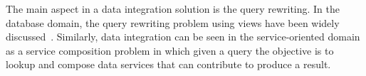 
The main aspect in a data integration solution is the query rewriting. In the database domain, the query rewriting problem using views have been widely discussed~\cite{Halevy:2001,Levy:1996,Duschka:1997,Pottinger:2001}.
Similarly, data integration can be seen in the service-oriented domain as a service composition problem in which given a query the objective is to lookup and compose data services that can contribute to produce a result.
%

%
%

%

